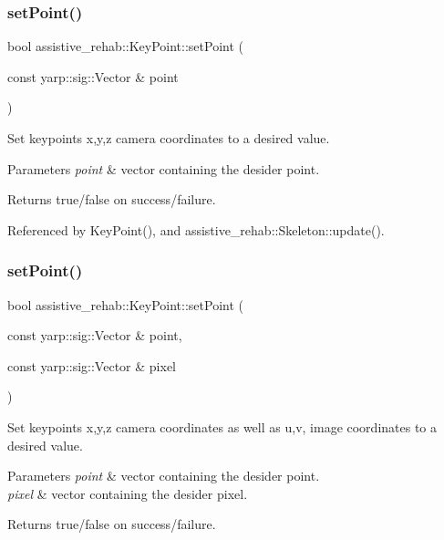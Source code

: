 \subsubsection{\texorpdfstring{set\+Point()}{setPoint()}\hspace{0.1cm}{\footnotesize\ttfamily [1/2]}}
{\footnotesize\ttfamily bool assistive\+\_\+rehab\+::\+Key\+Point\+::set\+Point (\begin{DoxyParamCaption}\item[{const yarp\+::sig\+::\+Vector \&}]{point }\end{DoxyParamCaption})}



Set keypoint\textquotesingle{}s x,y,z camera coordinates to a desired value. 


\begin{DoxyParams}{Parameters}
{\em point} & vector containing the desider point. \\
\hline
\end{DoxyParams}
\begin{DoxyReturn}{Returns}
true/false on success/failure. 
\end{DoxyReturn}


Referenced by Key\+Point(), and assistive\+\_\+rehab\+::\+Skeleton\+::update().

\mbox{\label{classassistive__rehab_1_1KeyPoint_adcb8950f2c32cdf93c3d4b2f6a9f1a70}} 
\subsubsection{\texorpdfstring{set\+Point()}{setPoint()}\hspace{0.1cm}{\footnotesize\ttfamily [2/2]}}
{\footnotesize\ttfamily bool assistive\+\_\+rehab\+::\+Key\+Point\+::set\+Point (\begin{DoxyParamCaption}\item[{const yarp\+::sig\+::\+Vector \&}]{point,  }\item[{const yarp\+::sig\+::\+Vector \&}]{pixel }\end{DoxyParamCaption})}



Set keypoint\textquotesingle{}s x,y,z camera coordinates as well as u,v, image coordinates to a desired value. 


\begin{DoxyParams}{Parameters}
{\em point} & vector containing the desider point. \\
\hline
{\em pixel} & vector containing the desider pixel. \\
\hline
\end{DoxyParams}
\begin{DoxyReturn}{Returns}
true/false on success/failure. 
\end{DoxyReturn}


